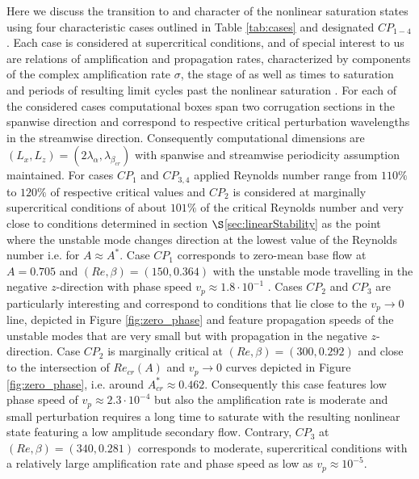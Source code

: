 \documentclass[lineno]{jfm}
\begin{document}
Here we discuss the transition to and character of the nonlinear saturation states using four characteristic cases outlined in Table \ref{tab:cases} and designated $CP_{1-4}$.
Each case is considered at supercritical conditions, and of special interest to us are relations of amplification and propagation rates, characterized by components of the complex amplification rate $\sigma$,
 
the  stage of  
as well as times to saturation  and periods of resulting limit cycles past the nonlinear saturation .
For each of the considered cases computational boxes span two corrugation sections in the spanwise direction and correspond to respective critical perturbation wavelengths in the streamwise direction.
Consequently computational dimensions are $(L_x,L_z)=(2\lambda_\alpha, \lambda_{\beta_{cr}})$
with spanwise and streamwise periodicity assumption maintained.
For cases $CP_{1}$ and $CP_{3,4}$ applied Reynolds number range from $110\%$ to $120\%$ of respective critical values and $CP_2$ is considered at marginally supercritical conditions of about $101\%$ of the critical Reynolds number and very close to conditions determined in
section $\S$\ref{sec:linearStability} as the point where the unstable mode changes direction at the lowest value of the Reynolds number i.e. for $A\approx A^*$.
Case $CP_1$ corresponds to zero-mean base flow at $A=0.705$ and $(Re, \beta)=(150, 0.364)$ with the unstable mode travelling in the negative $z$-direction with phase speed $v_p\approx1.8\cdot10^{-1}$
.
Cases $CP_2$ and $CP_3$ are particularly interesting and correspond to conditions that lie close to the $v_p\to0$ line, depicted in Figure \ref{fig:zero_phase} and feature propagation speeds of the unstable modes that are very small but with propagation in the negative $z$-direction.
Case $CP_2$ is marginally critical at $(Re, \beta)=(300, 0.292)$ and close to the intersection of $Re_{cr}(A)$ and $v_p\to0$ curves depicted in Figure \ref{fig:zero_phase}, i.e. around $A^{*}_{cr}\approx 0.462$.
Consequently this case features low phase speed of $v_p\approx2.3\cdot10^{-4}$ but also the amplification rate is moderate and small perturbation requires a long time to saturate with the resulting nonlinear state featuring a low amplitude secondary flow.
Contrary, $CP_3$ at $(Re, \beta)=(340, 0.281)$ corresponds to moderate, supercritical conditions with a relatively large amplification rate and phase speed as low as $v_p\approx10^{-5}$.
\end{document}
